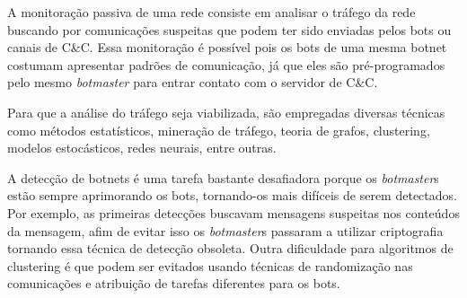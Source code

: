 A monitoração passiva de uma rede consiste em analisar o tráfego da rede buscando por comunicações suspeitas que podem ter sido enviadas pelos bots ou canais de C\&C. Essa monitoração é possível pois os bots de uma mesma botnet costumam apresentar padrões de comunicação, já que eles são pré-programados pelo mesmo \textit{botmaster} para entrar contato com o servidor de C\&C.

Para que a análise do tráfego seja viabilizada, são empregadas diversas técnicas como métodos estatísticos, mineração de tráfego, teoria de grafos, clustering, modelos estocásticos, redes neurais, entre outras.

A detecção de botnets é uma tarefa bastante desafiadora porque os \textit{botmaster}s estão sempre aprimorando os bots, tornando-os mais difíceis de serem detectados. Por exemplo, as primeiras detecções buscavam mensagens suspeitas nos conteúdos da mensagem, afim de evitar isso os \textit{botmaster}s passaram a utilizar criptografia tornando essa técnica de detecção obsoleta. Outra dificuldade para algoritmos de clustering é que podem ser evitados usando técnicas de randomização nas comunicações e atribuição de tarefas diferentes para os bots.

